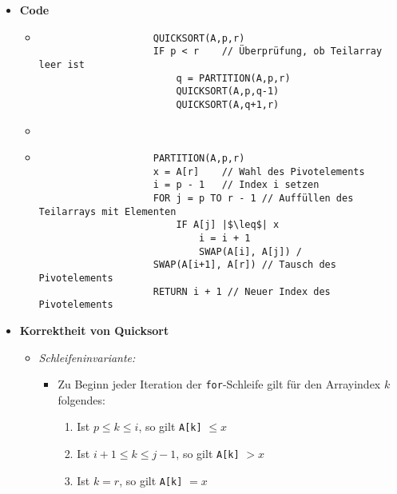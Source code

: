 \begin{itemize}
        \item \textbf{Code}
            \begin{itemize}
                \item[]
                    \begin{verbatim}
                    QUICKSORT(A,p,r)
                    IF p < r    // Überprüfung, ob Teilarray leer ist
                        q = PARTITION(A,p,r)
                        QUICKSORT(A,p,q-1)
                        QUICKSORT(A,q+1,r)
                    \end{verbatim}
                \item[]
                \item[]
                    \begin{verbatim}
                    PARTITION(A,p,r)
                    x = A[r]    // Wahl des Pivotelements
                    i = p - 1   // Index i setzen
                    FOR j = p TO r - 1 // Auffüllen des Teilarrays mit Elementen
                        IF A[j] |$\leq$| x
                            i = i + 1
                            SWAP(A[i], A[j]) /
                    SWAP(A[i+1], A[r]) // Tausch des Pivotelements
                    RETURN i + 1 // Neuer Index des Pivotelements
                    \end{verbatim}
            \end{itemize}

        \item \textbf{Korrektheit von Quicksort}
            \begin{itemize}
                \item \textit{Schleifeninvariante:}
                    \begin{itemize}
                        \item[]
                            Zu Beginn jeder Iteration der \texttt{for}-Schleife gilt für den Arrayindex $k$ folgendes:
                            \begin{enumerate}
                                \item Ist $p \leq k \leq i$, so gilt \texttt{A[k]} $\leq x$
                                \item Ist $i+1 \leq k \leq j -1$, so gilt \texttt{A[k]} $> x$
                                \item Ist $k = r$, so gilt \texttt{A[k]} $= x$ 
                            \end{enumerate}
                    \end{itemize}  
                

\end{itemize}
\end{itemize}
